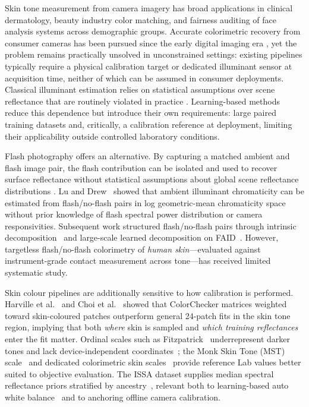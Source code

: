 \documentclass[11pt]{article}
\begin{document}
Skin tone measurement from camera imagery has broad applications in clinical dermatology, beauty industry color matching, and fairness auditing of face analysis systems across demographic groups.
Accurate colorimetric recovery from consumer cameras has been pursued since the early digital imaging era \cite{romero2006spectral}, yet the problem remains practically unsolved in unconstrained settings: existing pipelines typically require a physical calibration target or dedicated illuminant sensor at acquisition time, neither of which can be assumed in consumer deployments.
Classical illuminant estimation relies on statistical assumptions over scene reflectance that are routinely violated in practice \cite{gijsenij2011}.
Learning-based methods reduce this dependence but introduce their own requirements: large paired training datasets and, critically, a calibration reference at deployment, limiting their applicability outside controlled laboratory conditions.

Flash photography offers an alternative.
By capturing a matched ambient and flash image pair, the flash contribution can be isolated and used to recover surface reflectance without statistical assumptions about global scene reflectance distributions \cite{dicarlo2001illuminating,lu2006practical}.
Lu and Drew~\cite{lu2006practical} showed that ambient illuminant chromaticity can be estimated from flash/no-flash pairs in log geometric-mean chromaticity space without prior knowledge of flash spectral power distribution or camera responsivities.
Subsequent work structured flash/no-flash pairs through intrinsic decomposition~\cite{maralan2023computational} and large-scale learned decomposition on FAID~\cite{flashambient,upadhyay2025low}.
However, targetless flash/no-flash colorimetry of \emph{human skin}---evaluated against instrument-grade contact measurement across tone---has received limited systematic study.

Skin colour pipelines are additionally sensitive to how calibration is performed.
Harville et al.~\cite{harville2005consistent} and Choi et al.~\cite{choi2017performance} showed that ColorChecker matrices weighted toward skin-coloured patches outperform general 24-patch fits in the skin tone region, implying that both \emph{where} skin is sampled and \emph{which training reflectances} enter the fit matter.
Ordinal scales such as Fitzpatrick~\cite{fitzpatrick1988} underrepresent darker tones and lack device-independent coordinates~\cite{cook2025colorimetric}; the Monk Skin Tone (MST) scale~\cite{cheng2024monastic} and dedicated colorimetric skin scales~\cite{cook2025colorimetric} provide reference Lab values better suited to objective evaluation.
The ISSA dataset supplies median spectral reflectance priors stratified by ancestry~\cite{issa2025}, relevant both to learning-based auto white balance~\cite{zhou2025scr,wang2025perform} and to anchoring offline camera calibration.
\end{document}
